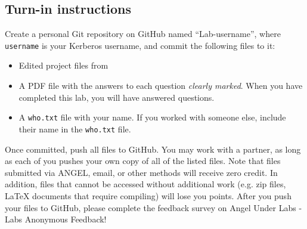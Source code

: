 \subsection*{Turn-in instructions}
Create a personal Git repository on GitHub named ``Lab\labnumber-username'', where \verb!username! is your Kerberos username, and commit the following files to it:
\begin{itemize}
\item Edited project files from \productname
\item A PDF file with the answers to each question \textit{clearly marked}. When you have completed this lab, you will have answered  questions.
\item A \verb!who.txt! file with your name. If you worked with someone else, include their name in the \verb!who.txt! file.
\end{itemize}

Once committed, push all files to GitHub. You may work with a partner, as long as each of you pushes your own copy of all of the listed files. Note that files submitted via ANGEL, email, or other methods will receive zero credit. In addition, files that cannot be accessed without additional work (e.g. zip files, LaTeX documents that require compiling) will lose you points. After you push your files to GitHub, please complete the feedback survey on Angel Under Labs - Labs Anonymous Feedback!
